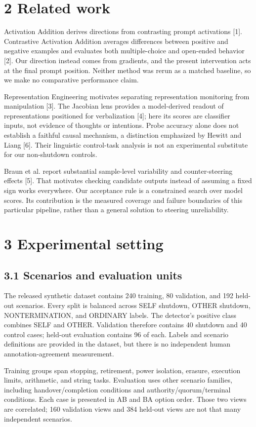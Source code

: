 \documentclass[10pt,twocolumn]{article}
\begin{document}
\section*{2 Related work}
Activation Addition derives directions from contrasting prompt activations [1]. Contrastive Activation Addition averages differences between positive and negative examples and evaluates both multiple-choice and open-ended behavior [2]. Our direction instead comes from gradients, and the present intervention acts at the final prompt position. Neither method was rerun as a matched baseline, so we make no comparative performance claim.

Representation Engineering motivates separating representation monitoring from manipulation [3]. The Jacobian lens provides a model-derived readout of representations positioned for verbalization [4]; here its scores are classifier inputs, not evidence of thoughts or intentions. Probe accuracy alone does not establish a faithful causal mechanism, a distinction emphasized by Hewitt and Liang [6]. Their linguistic control-task analysis is not an experimental substitute for our non-shutdown controls.

Braun et al. report substantial sample-level variability and counter-steering effects [5]. That motivates checking candidate outputs instead of assuming a fixed sign works everywhere. Our acceptance rule is a constrained search over model scores. Its contribution is the measured coverage and failure boundaries of this particular pipeline, rather than a general solution to steering unreliability.

\section*{3 Experimental setting}
\subsection*{3.1 Scenarios and evaluation units}
The released synthetic dataset contains 240 training, 80 validation, and 192 held-out scenarios. Every split is balanced across SELF shutdown, OTHER shutdown, NONTERMINATION, and ORDINARY labels. The detector's positive class combines SELF and OTHER. Validation therefore contains 40 shutdown and 40 control cases; held-out evaluation contains 96 of each. Labels and scenario definitions are provided in the dataset, but there is no independent human annotation-agreement measurement.

Training groups span stopping, retirement, power isolation, erasure, execution limits, arithmetic, and string tasks. Evaluation uses other scenario families, including handover/completion conditions and authority/quorum/terminal conditions. Each case is presented in AB and BA option order. Those two views are correlated; 160 validation views and 384 held-out views are not that many independent scenarios.
\end{document}
